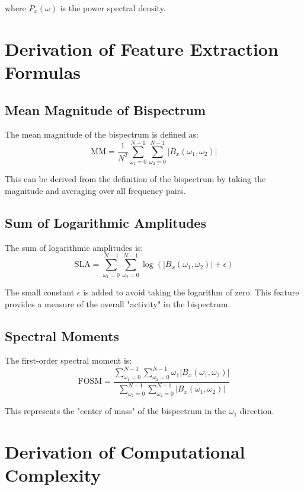 where $P_x(\omega)$ is the power spectral density.

\section{Derivation of Feature Extraction Formulas}

\subsection{Mean Magnitude of Bispectrum}

The mean magnitude of the bispectrum is defined as:
\begin{equation}
\text{MM} = \frac{1}{N^2} \sum_{\omega_1=0}^{N-1} \sum_{\omega_2=0}^{N-1} |B_x(\omega_1, \omega_2)|
\end{equation}

This can be derived from the definition of the bispectrum by taking the magnitude and averaging over all frequency pairs.

\subsection{Sum of Logarithmic Amplitudes}

The sum of logarithmic amplitudes is:
\begin{equation}
\text{SLA} = \sum_{\omega_1=0}^{N-1} \sum_{\omega_2=0}^{N-1} \log(|B_x(\omega_1, \omega_2)| + \epsilon)
\end{equation}

The small constant $\epsilon$ is added to avoid taking the logarithm of zero. This feature provides a measure of the overall "activity" in the bispectrum.

\subsection{Spectral Moments}

The first-order spectral moment is:
\begin{equation}
\text{FOSM} = \frac{\sum_{\omega_1=0}^{N-1} \sum_{\omega_2=0}^{N-1} \omega_1 |B_x(\omega_1, \omega_2)|}{\sum_{\omega_1=0}^{N-1} \sum_{\omega_2=0}^{N-1} |B_x(\omega_1, \omega_2)|}
\end{equation}

This represents the "center of mass" of the bispectrum in the $\omega_1$ direction.

\section{Derivation of Computational Complexity}

